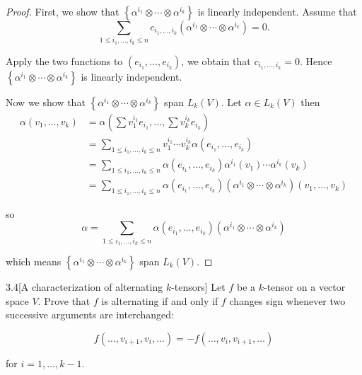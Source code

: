 \begin{proof}
	First, we show that \( \left\{ \alpha^{i_{1}} \otimes \cdots \otimes \alpha^{i_{k}} \right\} \) is linearly independent. Assume that
	\[
		\sum_{1\leq i_{1}, \ldots, i_{k} \leq n} c_{i_{1},\ldots, i_{k}}(\alpha^{i_{1}} \otimes \cdots \otimes \alpha^{i_{k}}) = 0.
	\]

	Apply the two functions to \( (e_{i_{1}}, \ldots, e_{i_{k}}) \), we obtain that \( c_{i_{1}, \ldots, i_{k}} = 0 \). Hence \( \left\{ \alpha^{i_{1}} \otimes \cdots \otimes \alpha^{i_{k}} \right\} \) is linearly independent.

	Now we show that  \( \left\{ \alpha^{i_{1}} \otimes \cdots \otimes \alpha^{i_{k}} \right\} \) span \( L_{k}(V) \). Let \( \alpha \in L_{k}(V) \) then
	\begingroup
	\allowdisplaybreaks%
	\begin{align*}
		\alpha(v_{1}, \ldots, v_{k}) & = \alpha\left(\sum v_{1}^{i_{1}}e_{i_{1}}, \ldots, \sum v_{k}^{i_{k}} e_{i_{k}}\right)                                                                       \\
		                             & = \sum_{1\leq i_{1}, \ldots, i_{k} \leq n} v_{1}^{i_{1}}\cdots v_{k}^{i_{k}} \alpha(e_{i_{1}}, \ldots, e_{i_{k}})                                            \\
		                             & = \sum_{1\leq i_{1}, \ldots, i_{k} \leq n} \alpha(e_{i_{1}}, \ldots, e_{i_{k}}) \alpha^{i_{1}}(v_{1})\cdots \alpha^{i_{k}}(v_{k})                            \\
		                             & = \sum_{1\leq i_{1}, \ldots, i_{k} \leq n} \alpha(e_{i_{1}}, \ldots, e_{i_{k}}) (\alpha^{i_{1}} \otimes \cdots \otimes \alpha^{i_{k}})(v_{1}, \ldots, v_{k})
	\end{align*}
	\endgroup

	so
	\[
		\alpha = \sum_{1\leq i_{1}, \ldots, i_{k} \leq n} \alpha(e_{i_{1}}, \ldots, e_{i_{k}}) (\alpha^{i_{1}} \otimes \cdots \otimes \alpha^{i_{k}})
	\]

	which means \( \left\{ \alpha^{i_{1}} \otimes \cdots \otimes \alpha^{i_{k}} \right\} \) span \( L_{k}(V) \).
\end{proof}

\begin{problem}{3.4}[A characterization of alternating \( k \)-tensors]
Let \( f \) be a \( k \)-tensor on a vector space \( V \). Prove that \( f \) is alternating if and only if \( f \) changes sign whenever two successive arguments are interchanged:

\[
	f(\ldots, v_{i+1}, v_{i}, \ldots) = -f(\ldots, v_{i}, v_{i+1}, \ldots)
\]

for \( i = 1, \ldots, k-1 \).
\end{problem}

